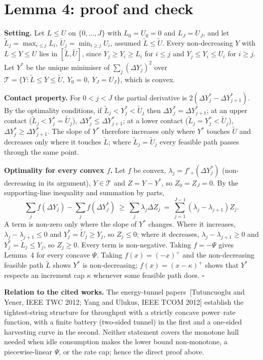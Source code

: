 \documentclass[10pt]{article}
\begin{document}
\section{Lemma 4: proof and check}
\textbf{Setting.} Let $L\le U$ on $\{0,\dots,J\}$ with $L_0=U_0=0$ and $L_J=U_J$, and let $\tilde L_j=\max_{i\le j}L_i$, $\tilde U_j=\min_{i\ge j}U_i$, assumed $\tilde L\le\tilde U$. Every non-decreasing $Y$ with $L\le Y\le U$ lies in $[\tilde L,\tilde U]$, since $Y_j\ge Y_i\ge L_i$ for $i\le j$ and $Y_j\le Y_i\le U_i$ for $i\ge j$. Let $Y^*$ be the unique minimiser of $\sum_j(\Delta Y_j)^2$ over $\mathcal{T}=\{Y:\tilde L\le Y\le\tilde U,\ Y_0=0,\ Y_J=U_J\}$, which is convex.

\textbf{Contact property.} For $0<j<J$ the partial derivative is $2(\Delta Y^*_j-\Delta Y^*_{j+1})$. By the optimality conditions, if $\tilde L_j<Y^*_j<\tilde U_j$ then $\Delta Y^*_j=\Delta Y^*_{j+1}$; at an upper contact ($\tilde L_j<Y^*_j=\tilde U_j$), $\Delta Y^*_j\le\Delta Y^*_{j+1}$; at a lower contact ($\tilde L_j=Y^*_j<\tilde U_j$), $\Delta Y^*_j\ge\Delta Y^*_{j+1}$. The slope of $Y^*$ therefore increases only where $Y^*$ touches $\tilde U$ and decreases only where it touches $\tilde L$; where $\tilde L_j=\tilde U_j$ every feasible path passes through the same point.

\textbf{Optimality for every convex $f$.} Let $f$ be convex, $\lambda_j=f'_+(\Delta Y^*_j)$ (non-decreasing in its argument), $Y\in\mathcal{T}$ and $Z=Y-Y^*$, so $Z_0=Z_J=0$. By the supporting-line inequality and summation by parts,
\[\sum_jf(\Delta Y_j)-\sum_jf(\Delta Y^*_j)\ \ge\ \sum_j\lambda_j\Delta Z_j\ =\ \sum_{j=1}^{J-1}(\lambda_j-\lambda_{j+1})Z_j .\]
A term is non-zero only where the slope of $Y^*$ changes. Where it increases, $\lambda_j-\lambda_{j+1}\le0$ and $Y^*_j=\tilde U_j\ge Y_j$, so $Z_j\le0$; where it decreases, $\lambda_j-\lambda_{j+1}\ge0$ and $Y^*_j=\tilde L_j\le Y_j$, so $Z_j\ge0$. Every term is non-negative. Taking $f=-\Psi$ gives Lemma~4 for every concave $\Psi$. Taking $f(x)=(-x)^+$ and the non-decreasing feasible path $\tilde L$ shows $Y^*$ is non-decreasing; $f(x)=(x-\kappa)^+$ shows that $Y^*$ respects an increment cap $\kappa$ whenever some feasible path does. $\square$

\textbf{Relation to the cited works.} The energy-tunnel papers~[Tutuncuoglu and Yener, IEEE TWC 2012; Yang and Ulukus, IEEE TCOM 2012] establish the tightest-string structure for throughput with a strictly concave power--rate function, with a finite battery (two-sided tunnel) in the first and a one-sided harvesting curve in the second. Neither statement covers the monotone hull needed when idle consumption makes the lower bound non-monotone, a piecewise-linear $\Psi$, or the rate cap; hence the direct proof above.
\end{document}
